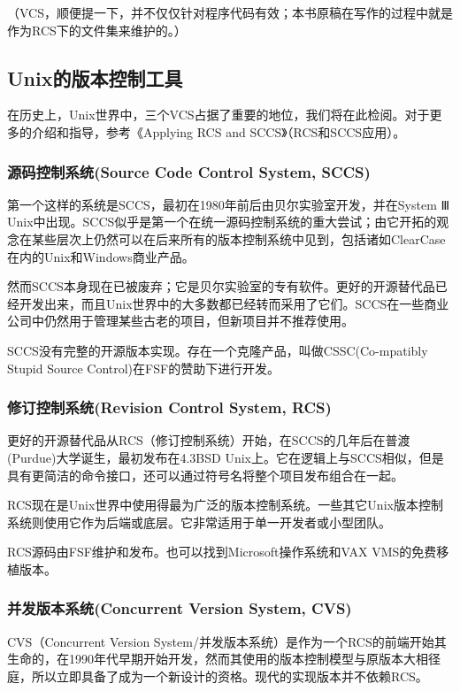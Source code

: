\documentclass[12pt,oneside]{book}
\begin{document}
（VCS，顺便提一下，并不仅仅针对程序代码有效；本书原稿在写作的过程中就是作为RCS下的文件集来维护的。）

\subsection{Unix的版本控制工具}
在历史上，Unix世界中，三个VCS占据了重要的地位，我们将在此检阅。对于更多的介绍和指导，参考《Applying RCS and SCCS》（RCS和SCCS应用）\cite{Bolinger-Bronson}。

\subsubsection{源码控制系统(Source Code Control System, SCCS)}
第一个这样的系统是SCCS，最初在1980年前后由贝尔实验室开发，并在System Ⅲ Unix中出现。SCCS似乎是第一个在统一源码控制系统的重大尝试；由它开拓的观念在某些层次上仍然可以在后来所有的版本控制系统中见到，包括诸如ClearCase在内的Unix和Windows商业产品。

然而SCCS本身现在已被废弃；它是贝尔实验室的专有软件。更好的开源替代品已经开发出来，而且Unix世界中的大多数都已经转而采用了它们。SCCS在一些商业公司中仍然用于管理某些古老的项目，但新项目并不推荐使用。

SCCS没有完整的开源版本实现。存在一个克隆产品，叫做CSSC(Co-mpatibly Stupid Source Control)在FSF的赞助下进行开发。

\subsubsection{修订控制系统(Revision Control System, RCS)}
更好的开源替代品从RCS（修订控制系统）开始，在SCCS的几年后在普渡(Purdue)大学诞生，最初发布在4.3BSD Unix上。它在逻辑上与SCCS相似，但是具有更简洁的命令接口，还可以通过符号名将整个项目发布组合在一起。

RCS现在是Unix世界中使用得最为广泛的版本控制系统。一些其它Unix版本控制系统则使用它作为后端或底层。它非常适用于单一开发者或小型团队。

RCS源码由FSF维护和发布。也可以找到Microsoft操作系统和VAX VMS的免费移植版本。

\subsubsection{并发版本系统(Concurrent Version System, CVS)}
CVS（Concurrent Version System/并发版本系统）是作为一个RCS的前端开始其生命的，在1990年代早期开始开发，然而其使用的版本控制模型与原版本大相径庭，所以立即具备了成为一个新设计的资格。现代的实现版本并不依赖RCS。
\end{document}
